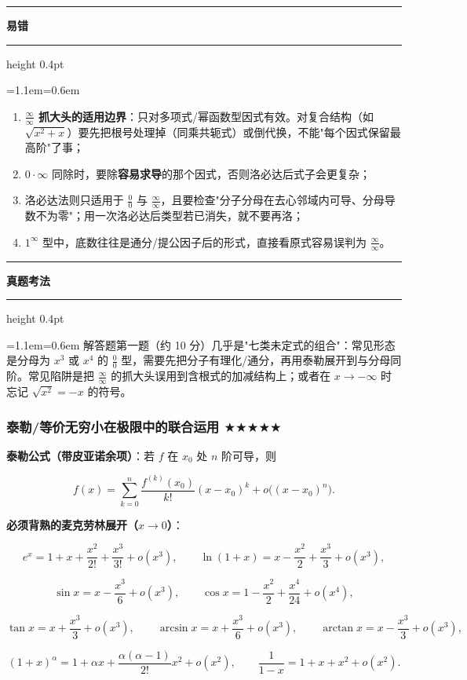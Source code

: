 \documentclass[11pt,openany,UTF8]{ctexbook}
\newcommand{\callouthead}[2]{%
  \par\addvspace{7pt}\noindent
  {\color{#1}\rule[-0.15em]{3pt}{1.05em}}\hspace{0.5em}%
  {\bfseries\color{#1}#2}\par\nobreak\vspace{-0.35em}%
  {\color{rulesep}\hrule height 0.4pt}\nobreak\vspace{0.45em}%
  \begingroup\small\setlength{\parindent}{0pt}%
  \leftskip=1.1em\rightskip=0.6em\noindent\ignorespaces}
\newcommand{\calloutend}{\par\endgroup\addvspace{7pt}}
\newenvironment{callwarn}[1]{\callouthead{warnbar}{#1}}{\calloutend}
\newenvironment{callexam}[1]{\callouthead{exambar}{#1}}{\calloutend}
\begin{document}
\begin{callwarn}{易错}
\begin{enumerate}
\item \textbf{$\frac{\infty}{\infty}$ 抓大头的适用边界}：只对多项式/幂函数型因式有效。对复合结构（如 $\sqrt{x^2+x}$）要先把根号处理掉（同乘共轭式）或倒代换，不能"每个因式保留最高阶"了事；
\item $0\cdot\infty$ 同除时，要除\textbf{容易求导}的那个因式，否则洛必达后式子会更复杂；
\item 洛必达法则只适用于 $\frac00$ 与 $\frac{\infty}{\infty}$，且要检查"分子分母在去心邻域内可导、分母导数不为零"；用一次洛必达后类型若已消失，就不要再洛；
\item $1^\infty$ 型中，底数往往是通分/提公因子后的形式，直接看原式容易误判为 $\frac{\infty}{\infty}$。
\end{enumerate}
\end{callwarn}

\begin{callexam}{真题考法}
解答题第一题（约 10 分）几乎是"七类未定式的组合"：常见形态是分母为 $x^{3}$ 或 $x^{4}$ 的 $\frac00$ 型，需要先把分子有理化/通分，再用泰勒展开到与分母同阶。常见陷阱是把 $\frac{\infty}{\infty}$ 的抓大头误用到含根式的加减结构上；或者在 $x\to-\infty$ 时忘记 $\sqrt{x^2}=-x$ 的符号。

\end{callexam}

\subsubsection{泰勒/等价无穷小在极限中的联合运用 $\bigstar$$\bigstar$$\bigstar$$\bigstar$$\bigstar$}

\textbf{泰勒公式（带皮亚诺余项）}：若 $f$ 在 $x_0$ 处 $n$ 阶可导，则

\[f(x)=\sum_{k=0}^{n}\frac{f^{(k)}(x_0)}{k!}(x-x_0)^{k}+o\bigl((x-x_0)^{n}\bigr).\]

\textbf{必须背熟的麦克劳林展开（$x\to 0$）}：

\[e^{x}=1+x+\frac{x^{2}}{2!}+\frac{x^{3}}{3!}+o(x^{3}),\qquad \ln(1+x)=x-\frac{x^{2}}{2}+\frac{x^{3}}{3}+o(x^{3}),\]

\[\sin x=x-\frac{x^{3}}{6}+o(x^{3}),\qquad \cos x=1-\frac{x^{2}}{2}+\frac{x^{4}}{24}+o(x^{4}),\]

\[\tan x=x+\frac{x^{3}}{3}+o(x^{3}),\qquad \arcsin x=x+\frac{x^{3}}{6}+o(x^{3}),\qquad \arctan x=x-\frac{x^{3}}{3}+o(x^{3}),\]

\[(1+x)^{\alpha}=1+\alpha x+\frac{\alpha(\alpha-1)}{2!}x^{2}+o(x^{2}),\qquad \frac{1}{1-x}=1+x+x^{2}+o(x^{2}).\]
\end{document}
